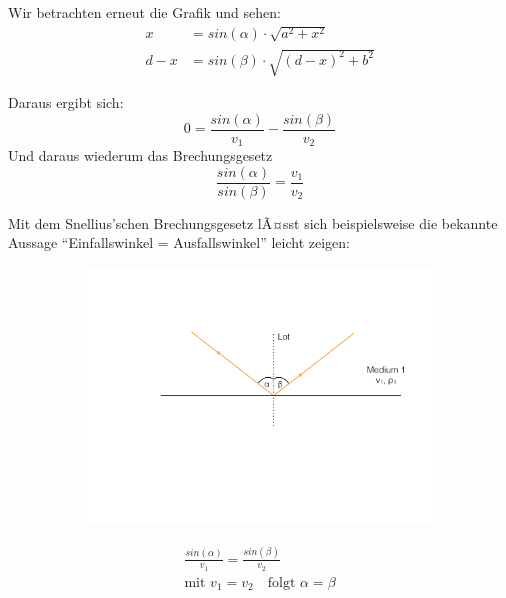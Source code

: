 Wir betrachten erneut die Grafik und sehen: \begin{align*}
	x &= sin(\alpha) \cdot \sqrt{a^2 + x^2} \\
	d - x &= sin(\beta) \cdot \sqrt{(d - x)^2 + b^2}
\end{align*}

Daraus ergibt sich: \begin{equation*}
	0 = \frac{sin(\alpha)}{v_1} - \frac{sin(\beta)}{v_2}
\end{equation*} 
Und daraus wiederum das Brechungsgesetz \begin{equation*}
	\frac{sin(\alpha)}{sin(\beta)} = \frac{v_1}{v_2}
\end{equation*}

Mit dem Snellius'schen Brechungsgesetz lÃ¤sst sich beispielsweise die bekannte Aussage "`Einfallswinkel = Ausfallswinkel"' leicht zeigen: 

\begin{figure}[H]
	\begin{subfigure}[m]{0.5\textwidth}
	\centering
		\includegraphics[scale=0.3]{SeismikBilder/EinfallsAusfallswinkel}
	\end{subfigure}
	\begin{subfigure}[m]{0.75\textwidth}
	\centering
		\[\begin{aligned}
			\frac{sin(\alpha)}{v_1} = \frac{sin(\beta)}{v_2} \\ \text{mit } v_1 = v_2 \quad \text{folgt } \alpha = \beta 
 		\end{aligned}\]
	\end{subfigure}
\end{figure}


